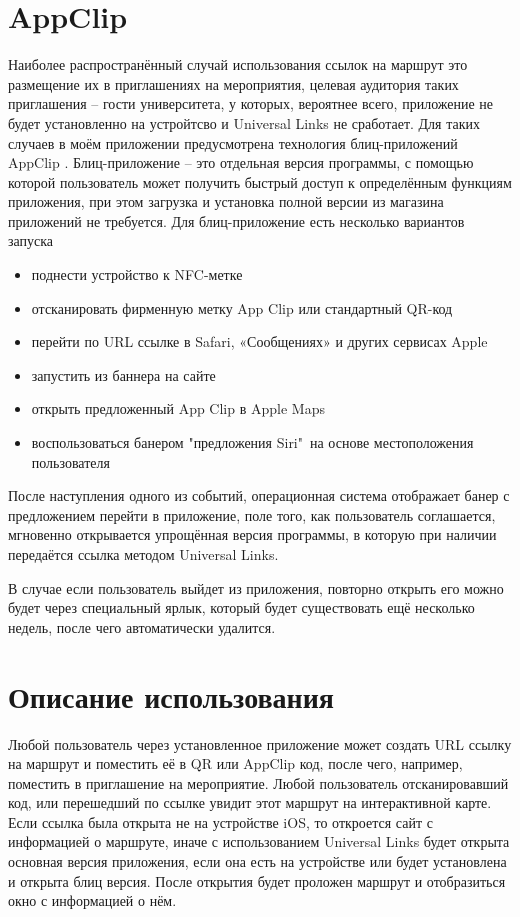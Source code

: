   \section{AppClip}
    Наиболее распространённый случай использования ссылок на маршрут это размещение их в приглашениях на мероприятия, целевая аудитория таких приглашения -- гости университета, у которых, вероятнее всего, приложение не будет установленно на устройтсво и Universal Links не сработает. Для таких случаев в моём приложении предусмотрена технология блиц-приложений AppClip \cite{AppClip}.
    Блиц-приложение -- это отдельная версия программы, с помощью которой пользователь может получить быстрый доступ к определённым функциям приложения, при этом загрузка и установка полной версии из магазина приложений не требуется.
    Для блиц-приложение есть несколько вариантов запуска
    \begin{itemize}
      \item поднести устройство к NFC-метке
      \item отсканировать фирменную метку App Clip или стандартный QR-код
      \item перейти по URL ссылке в Safari, «Сообщениях» и других сервисах Apple
      \item запустить из баннера на сайте
      \item открыть предложенный App Clip в Apple Maps
      \item воспользоваться банером "предложения Siri"\ на основе местоположения пользователя
    \end{itemize}


    После наступления одного из событий, операционная система отображает банер с предложением перейти в приложение, поле того, как пользователь соглашается, мгновенно открывается упрощённая версия программы, в которую при наличии передаётся ссылка методом Universal Links.

    В случае если пользователь выйдет из приложения, повторно открыть его можно будет через специальный ярлык, который будет существовать ещё несколько недель, после чего автоматически удалится.

  \section{Описание использования}
    Любой пользователь через установленное приложение может создать URL ссылку на маршрут и поместить её в QR или AppClip код, после чего, например, поместить в приглашение на мероприятие. Любой пользователь отсканировавший код, или перешедший по ссылке увидит этот маршрут на интерактивной карте.
    Если ссылка была открыта не на устройстве iOS, то откроется сайт с информацией о маршруте, иначе с использованием Universal Links будет открыта основная версия приложения, если она есть на устройстве или будет установлена и открыта блиц версия. После открытия будет проложен маршрут и отобразиться окно с информацией о нём.

